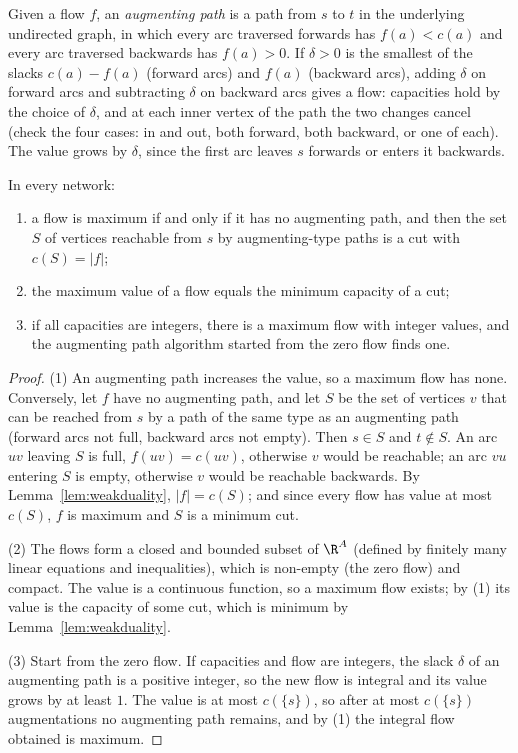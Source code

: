 Given a flow $f$, an \emph{augmenting path} is a path from $s$ to $t$ in the underlying undirected graph, in which every arc traversed
forwards has $f(a)<c(a)$ and every arc traversed backwards has $f(a)>0$. If $\delta>0$ is the smallest of the slacks $c(a)-f(a)$ (forward
arcs) and $f(a)$ (backward arcs), adding $\delta$ on forward arcs and subtracting $\delta$ on backward arcs gives a flow: capacities hold by the
choice of $\delta$, and at each inner vertex of the path the two changes cancel (check the four cases: in and out, both forward,
both backward, or one of each). The value grows by $\delta$, since the first arc leaves $s$ forwards or enters it backwards.

\begin{theorem}\label{thm:maxflow}
In every network:
\begin{enumerate}
\item a flow is maximum if and only if it has no augmenting path, and then the set $S$ of vertices reachable from $s$ by
augmenting-type paths is a cut with $c(S)=|f|$;
\item the maximum value of a flow equals the minimum capacity of a cut;
\item if all capacities are integers, there is a maximum flow with integer values, and the augmenting path algorithm started
from the zero flow finds one.
\end{enumerate}
\end{theorem}
\begin{proof}
(1) An augmenting path increases the value, so a maximum flow has none. Conversely, let $f$ have no augmenting path, and let $S$
be the set of vertices $v$ that can be reached from $s$ by a path of the same type as an augmenting path (forward arcs not full,
backward arcs not empty). Then $s\in S$ and $t\notin S$. An arc $uv$ leaving $S$ is full, $f(uv)=c(uv)$, otherwise $v$ would be reachable;
an arc $vu$ entering $S$ is empty, otherwise $v$ would be reachable backwards. By Lemma~\ref{lem:weakduality}, $|f|=c(S)$; and since every
flow has value at most $c(S)$, $f$ is maximum and $S$ is a minimum cut.

(2) The flows form a closed and bounded subset of $\R^A$ (defined by finitely many linear equations and inequalities), which is
non-empty (the zero flow) and compact. The value is a continuous function, so a maximum flow exists; by (1) its value is the
capacity of some cut, which is minimum by Lemma~\ref{lem:weakduality}.

(3) Start from the zero flow. If capacities and flow are integers, the slack $\delta$ of an augmenting path is a positive integer,
so the new flow is integral and its value grows by at least $1$. The value is at most $c(\{s\})$, so after at most $c(\{s\})$
augmentations no augmenting path remains, and by (1) the integral flow obtained is maximum.
\end{proof}

